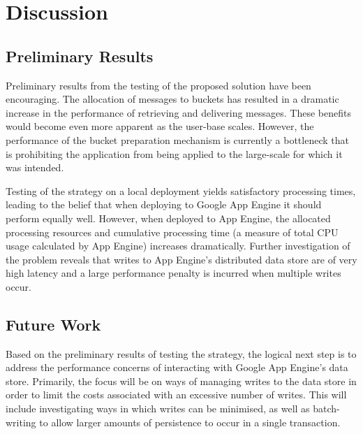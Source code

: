 \documentclass{article}
\begin{document}


\section{Discussion} %
\label{sec:discussion}

\subsection{Preliminary Results} %
\label{sub:preliminary_results}

Preliminary results from the testing of the proposed solution have been encouraging. The allocation of messages to buckets has resulted in a dramatic increase in the performance of retrieving and delivering messages. These benefits would become even more apparent as the user-base scales. However, the performance of the bucket preparation mechanism is currently a bottleneck that is prohibiting the application from being applied to the large-scale for which it was intended.

Testing of the strategy on a local deployment yields satisfactory processing times, leading to the belief that when deploying to Google App Engine it should perform equally well. However, when deployed to App Engine, the allocated processing resources and cumulative processing time (a measure of total CPU usage calculated by App Engine) increases dramatically. Further investigation of the problem reveals that writes to App Engine's distributed data store are of very high latency and a large performance penalty is incurred when multiple writes occur.


\subsection{Future Work} %
\label{sub:future_work}

Based on the preliminary results of testing the strategy, the logical next step is to address the performance concerns of interacting with Google App Engine's data store. Primarily, the focus will be on ways of managing writes to the data store in order to limit the costs associated with an excessive number of writes. This will include investigating ways in which writes can be minimised, as well as batch-writing to allow larger amounts of persistence to occur in a single transaction.
\end{document}
